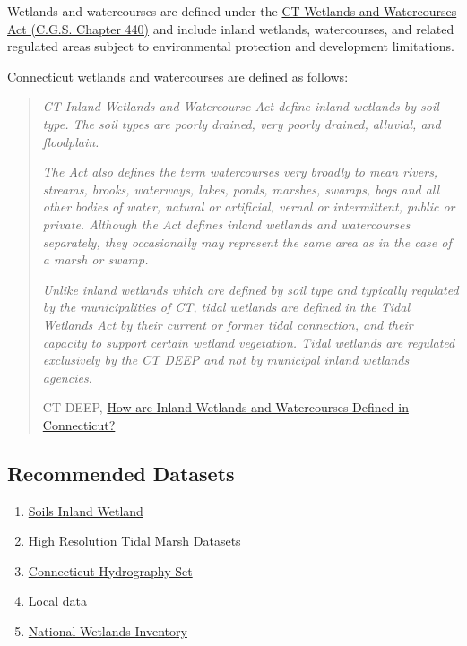\documentclass[
  letterpaper,
  DIV=11,
  numbers=noendperiod]{scrreprt}
\providecommand{\tightlist}{%
  \setlength{\itemsep}{0pt}\setlength{\parskip}{0pt}}
\begin{document}
Wetlands and watercourses are defined under the
\href{https://www.cga.ct.gov/2019/pub/chap_440.htm}{CT Wetlands and
Watercourses Act (C.G.S. Chapter 440)} and include inland wetlands,
watercourses, and related regulated areas subject to environmental
protection and development limitations.

Connecticut wetlands and watercourses are defined as follows:

\begin{quote}
\emph{CT Inland Wetlands and Watercourse Act define inland wetlands by
soil type. The soil types are poorly drained, very poorly drained,
alluvial, and floodplain.}

\emph{The Act also defines the term watercourses very broadly to mean
rivers, streams, brooks, waterways, lakes, ponds, marshes, swamps, bogs
and all other bodies of water, natural or artificial, vernal or
intermittent, public or private. Although the Act defines inland
wetlands and watercourses separately, they occasionally may represent
the same area as in the case of a marsh or swamp.}

\emph{Unlike inland wetlands which are defined by soil type and
typically regulated by the municipalities of CT, tidal wetlands are
defined in the Tidal Wetlands Act by their current or former tidal
connection, and their capacity to support certain wetland vegetation.
Tidal wetlands are regulated exclusively by the CT DEEP and not by
municipal inland wetlands agencies.}

CT DEEP,
\href{https://portal.ct.gov/DEEP/Water/Inland-Wetlands/How-Are-Inland--Wetlands-and-Watercourses--Defined}{How
are Inland Wetlands and Watercourses Defined in Connecticut?}
\end{quote}

\subsection{Recommended Datasets}\label{recommended-datasets-2}

\begin{enumerate}
\def\labelenumi{\arabic{enumi}.}
\tightlist
\item
  \hyperref[sec-soils-inland-wetland]{Soils Inland Wetland}
\item
  \hyperref[sec-high-resolution-tidal-marsh-datasets]{High Resolution
  Tidal Marsh Datasets}
\item
  \hyperref[sec-connecticut-hydrography-set]{Connecticut Hydrography
  Set}
\item
  \hyperref[sec-local-data3]{Local data}
\item
  \hyperref[sec-nwi]{National Wetlands Inventory}
\end{enumerate}
\end{document}
